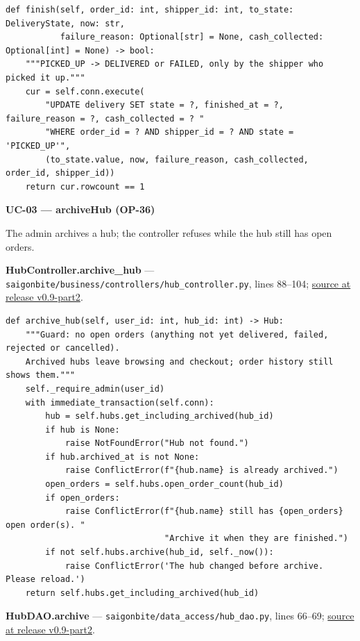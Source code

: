 \begin{lstlisting}
def finish(self, order_id: int, shipper_id: int, to_state: DeliveryState, now: str,
           failure_reason: Optional[str] = None, cash_collected: Optional[int] = None) -> bool:
    """PICKED_UP -> DELIVERED or FAILED, only by the shipper who picked it up."""
    cur = self.conn.execute(
        "UPDATE delivery SET state = ?, finished_at = ?, failure_reason = ?, cash_collected = ? "
        "WHERE order_id = ? AND shipper_id = ? AND state = 'PICKED_UP'",
        (to_state.value, now, failure_reason, cash_collected, order_id, shipper_id))
    return cur.rowcount == 1
\end{lstlisting}
\textbf{UC-03 --- archiveHub (OP-36)}

The admin archives a hub; the controller refuses while the hub still has open orders.

\textbf{HubController.archive\_hub} --- \texttt{saigonbite/\allowbreak{}business/\allowbreak{}controllers/\allowbreak{}hub\_\allowbreak{}controller.\allowbreak{}py}, lines 88--104; \href{\TargetRepo\detokenize{/blob/v0.9-part2/saigonbite/business/controllers/hub_controller.py#L88-L104}}{source at release v0.9-part2}.

\begin{lstlisting}
def archive_hub(self, user_id: int, hub_id: int) -> Hub:
    """Guard: no open orders (anything not yet delivered, failed, rejected or cancelled).
    Archived hubs leave browsing and checkout; order history still shows them."""
    self._require_admin(user_id)
    with immediate_transaction(self.conn):
        hub = self.hubs.get_including_archived(hub_id)
        if hub is None:
            raise NotFoundError("Hub not found.")
        if hub.archived_at is not None:
            raise ConflictError(f"{hub.name} is already archived.")
        open_orders = self.hubs.open_order_count(hub_id)
        if open_orders:
            raise ConflictError(f"{hub.name} still has {open_orders} open order(s). "
                                "Archive it when they are finished.")
        if not self.hubs.archive(hub_id, self._now()):
            raise ConflictError('The hub changed before archive. Please reload.')
    return self.hubs.get_including_archived(hub_id)
\end{lstlisting}
\textbf{HubDAO.archive} --- \texttt{saigonbite/\allowbreak{}data\_\allowbreak{}access/\allowbreak{}hub\_\allowbreak{}dao.\allowbreak{}py}, lines 66--69; \href{\TargetRepo\detokenize{/blob/v0.9-part2/saigonbite/data_access/hub_dao.py#L66-L69}}{source at release v0.9-part2}.

